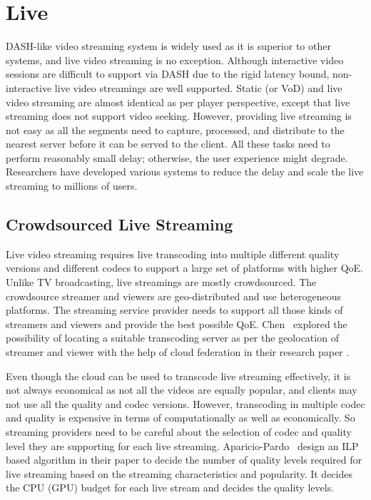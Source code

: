 \section{Live}
\label{chapter02:live}
DASH-like video streaming system is widely used as it is superior to other systems, and live video streaming is no exception. Although interactive video sessions are difficult to support via DASH due to the rigid latency bound, non-interactive live video streamings are well supported. Static (or VoD) and live video streaming are almost identical as per player perspective, except that live streaming does not support video seeking. However, providing live streaming is not easy as all the segments need to capture, processed, and distribute to the nearest server before it can be served to the client. All these tasks need to perform reasonably small delay; otherwise, the user experience might degrade. Researchers have developed various systems to reduce the delay and scale the live streaming to millions of users.

\subsection{Crowdsourced Live Streaming}
Live video streaming requires live transcoding into multiple different quality versions and different codecs to support a large set of platforms with higher QoE. Unlike TV broadcasting, live streamings are mostly crowdsourced. The crowdsource streamer and viewers are geo-distributed and use heterogeneous platforms. The streaming service provider needs to support all those kinds of streamers and viewers and provide the best possible QoE. Chen \etal\ explored the possibility of locating a suitable transcoding server as per the geolocation of streamer and viewer with the help of cloud federation in their research paper \cite{7218642}.

Even though the cloud can be used to transcode live streaming effectively, it is not always economical as not all the videos are equally popular, and clients may not use all the quality and codec versions. However, transcoding in multiple codec and quality is expensive in terms of computationally as well as economically. So streaming providers need to be careful about the selection of codec and quality level they are supporting for each live streaming. Aparicio-Pardo \etal\ design an ILP based algorithm in their paper \cite{10.1145/2713168.2713177} to decide the number of quality levels required for live streaming based on the streaming characteristics and popularity. It decides the CPU (GPU) budget for each live stream and decides the quality levels. 



